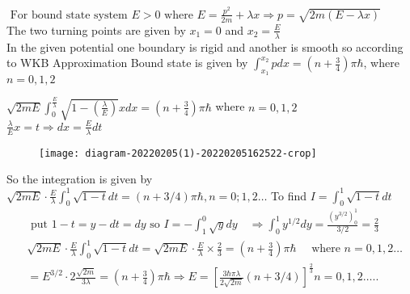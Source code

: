 \begin{enumerate}
\begin{minipage}{\textwidth}
\end{minipage}
\begin{answer}
$\text { For bound state system } E>0 \text { where } E=\frac{p^{2}}{2 m}+\lambda x \Rightarrow p=\sqrt{2 m(E-\lambda x)}$\\
The two turning points are given by $x_{1}=0$ and $x_{2}=\frac{E}{\lambda}$\\
In the given potential one boundary is rigid and another is smooth so according to WKB
Approximation Bound state is given by $\int_{x_{1}}^{x_{2}} p d x=\left(n+\frac{3}{4}\right) \pi \hbar$, where $n=0,1,2$\\
\begin{minipage}{0.5\textwidth}
$\sqrt{2 m E} \int_{0}^{\frac{E}{\lambda}} \sqrt{1-\left(\frac{\lambda}{E}\right)} x d x=\left(n+\frac{3}{4}\right) \pi \hbar$ where $n=0,1,2$ \\
$\frac{\lambda}{E} x=t \Rightarrow d x=\frac{E}{\lambda} d t$\\
\end{minipage}
\begin{minipage}{0.5\textwidth}
\begin{figure}[H]
	\centering
	\texttt{[image: diagram-20220205(1)-20220205162522-crop]}
\end{figure}
\end{minipage}
So the integration is given by $\sqrt{2 m E} \cdot \frac{E}{\lambda} \int_{0}^{1} \sqrt{1-t} d t=(n+3 / 4) \pi \hbar, n=0 ; 1,2 \ldots$ To find $I=\int_{0}^{1} \sqrt{1-t} d t$\\
\begin{align*}
	&\text { put } 1-t=y-d t=d y \text { so } I=-\int_{1}^{0} \sqrt{y} d y \quad \Rightarrow \int_{0}^{1} y^{1 / 2} d y=\frac{\left(y^{3 / 2}\right)_{0}^{1}}{3 / 2}=\frac{2}{3} \\
	&\sqrt{2 m E} \cdot \frac{E}{\lambda} \int_{0}^{1} \sqrt{1-t} d t=\sqrt{2 m E} \cdot \frac{E}{\lambda} \times \frac{2}{3}=\left(n+\frac{3}{4}\right) \pi \hbar \quad \text { where } n=0,1,2 \ldots \\
	&=E^{3 / 2} \cdot 2 \frac{\sqrt{2 m}}{3 \lambda}=\left(n+\frac{3}{4}\right) \pi \hbar \Rightarrow E=\left[\frac{3 \hbar \pi \lambda}{2 \sqrt{2 m}}(n+3 / 4)\right]^{\frac{2}{3}} n=0,1,2 \ldots . .
\end{align*}	
\end{answer}
 \end{enumerate}
 
 
 
 
 
